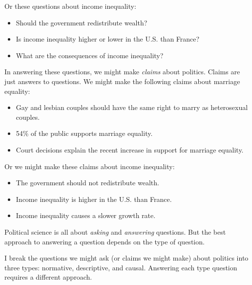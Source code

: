 \documentclass[]{book}
\providecommand{\tightlist}{%
  \setlength{\itemsep}{0pt}\setlength{\parskip}{0pt}}
\theoremstyle{definition}
\theoremstyle{definition}
\theoremstyle{definition}
\theoremstyle{remark}
\begin{document}
Or these questions about income inequality:

\begin{itemize}
\tightlist
\item
  Should the government redistribute wealth?
\item
  Is income inequality higher or lower in the U.S. than France?
\item
  What are the consequences of income inequality?
\end{itemize}

In answering these questions, we might make \emph{claims} about
politics. Claims are just answers to questions. We might make the
following claims about marriage equality:

\begin{itemize}
\tightlist
\item
  Gay and lesbian couples should have the same right to marry as
  heterosexual couples.
\item
  54\% of the public supports marriage equality.
\item
  Court decisions explain the recent increase in support for marriage
  equality.
\end{itemize}

Or we might make these claims about income inequality:

\begin{itemize}
\tightlist
\item
  The government should not redistribute wealth.
\item
  Income inequality is higher in the U.S. than France.
\item
  Income inequality causes a slower growth rate.
\end{itemize}

Political science is all about \emph{asking} and \emph{answering}
questions. But the best approach to answering a question depends on the
type of question.

I break the questions we might ask (or claims we might make) about
politics into three types: normative, descriptive, and causal. Answering
each type question requires a different approach.
\end{document}
